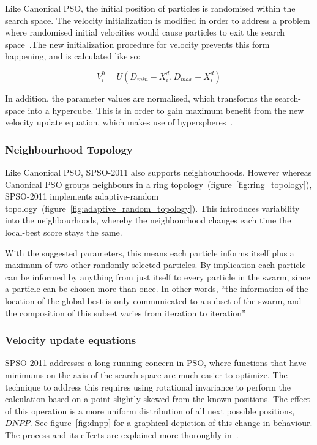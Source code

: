 \documentclass{csfourzero}
\begin{document}
Like Canonical PSO, the initial position of particles is randomised within the
search space. The velocity initialization is modified in order to address a
problem where randomised initial velocities would cause particles to exit the
search space~\cite{Helwig:2008bl}.The new initialization procedure for velocity
prevents this form happening, and is calculated like so:

\begin{equation}
  V_i^0 = U(D_{min} - X_i^d, D_{max} - X_i^d)
\end{equation}

In addition, the parameter values are normalised, which transforms the
search-space into a hypercube. This is in order to gain maximum benefit from the
new velocity update equation, which makes use of
hyperspheres~\cite{Clerc:2012to}.

\subsubsection{Neighbourhood Topology}

Like Canonical PSO, SPSO-2011 also supports neighbourhoods. However whereas
Canonical PSO groups neighbours in a ring
topology~(figure~\ref{fig:ring_topology}), SPSO-2011 implements adaptive-random
topology~(figure~\ref{fig:adaptive_random_topology}). This introduces
variability into the neighbourhoods, whereby the neighbourhood changes each
time the local-best score stays the same.

With the suggested parameters, this means each particle informs itself plus a
maximum of two other randomly selected particles. By implication each particle
can be informed by anything from just itself to every particle in the swarm,
since a particle can be chosen more than once. In other words, ``the information
of the location of the global best is only communicated to a subset of the
swarm, and the composition of this subset varies from iteration to
iteration''~\cite{Miranda:2007er}

\subsubsection{Velocity update equations}

SPSO-2011 addresses a long running concern in PSO, where functions that
have minimums on the axis of the search space are much easier to optimize. The
technique to address this requires using rotational invariance to perform the
calculation based on a point slightly skewed from the known positions. The
effect of this operation is a more uniform distribution of all next possible
positions, $DNPP$. See figure~\ref{fig:dnpp} for a graphical depiction of this
change in behaviour.  The process and its effects are explained more thoroughly
in~\cite{ZambranoBigiarini:2013dl}.
\end{document}
